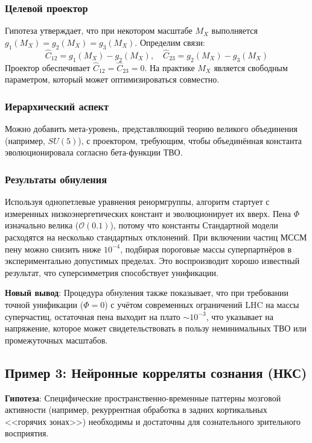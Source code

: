 \documentclass[11pt,a4paper]{article}
\begin{document}
\subsubsection{Целевой проектор}
Гипотеза утверждает, что при некотором масштабе \(M_X\) выполняется \(g_1(M_X) = g_2(M_X) = g_3(M_X)\). Определим связи:
\[
\hat{C}_{12} = g_1(M_X) - g_2(M_X), \quad \hat{C}_{23} = g_2(M_X) - g_3(M_X)
\]
Проектор обеспечивает \(\hat{C}_{12} = \hat{C}_{23} = 0\). На практике \(M_X\) является свободным параметром, который может оптимизироваться совместно.

\subsubsection{Иерархический аспект}
Можно добавить мета-уровень, представляющий теорию великого объединения (например, \(SU(5)\)), с проектором, требующим, чтобы объединённая константа эволюционировала согласно бета-функции ТВО.

\subsubsection{Результаты обнуления}
Используя однопетлевые уравнения ренормгруппы, алгоритм стартует с измеренных низкоэнергетических констант и эволюционирует их вверх. Пена \(\Phi\) изначально велика (\(\mathcal{O}(0.1)\)), потому что константы Стандартной модели расходятся на несколько стандартных отклонений. При включении частиц МССМ пену можно снизить ниже \(10^{-4}\), подбирая пороговые массы суперпартнёров в экспериментально допустимых пределах. Это воспроизводит хорошо известный результат, что суперсимметрия способствует унификации.

\textbf{Новый вывод}: Процедура обнуления также показывает, что при требовании точной унификации (\(\Phi=0\)) с учётом современных ограничений LHC на массы суперчастиц, остаточная пена выходит на плато \(\sim 10^{-3}\), что указывает на напряжение, которое может свидетельствовать в пользу неминимальных ТВО или промежуточных масштабов.

\subsection{Пример 3: Нейронные корреляты сознания (НКС)}

\textbf{Гипотеза}: Специфические пространственно-временные паттерны мозговой активности (например, рекуррентная обработка в задних кортикальных <<горячих зонах>>) необходимы и достаточны для сознательного зрительного восприятия.
\end{document}
